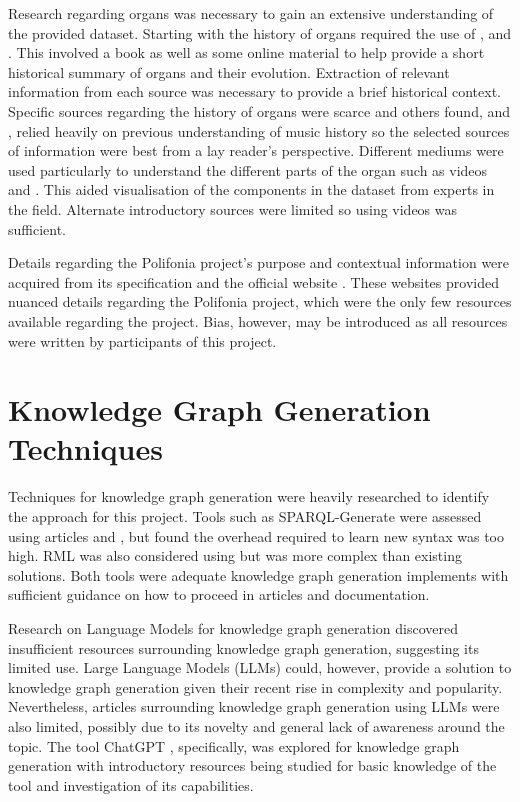 Research regarding organs was necessary to gain an extensive understanding of the provided dataset. Starting with the history of organs required the use of \cite{organhistory}, \cite{organhistory1} and \cite{organmedivalhistory}. This involved a book as well as some online material to help provide a short historical summary of organs and their evolution. Extraction of relevant information from each source was necessary to provide a brief historical context. Specific sources regarding the history of organs were scarce and others found, \cite{apel1948early} and \cite{ochse1988history}, relied heavily on previous understanding of music history so the selected sources of information were best from a lay reader's perspective. Different mediums were used particularly to understand the different parts of the organ such as videos \cite{organvideo} and \cite{organvideo1}. This aided visualisation of the components in the dataset from experts in the field. Alternate introductory sources were limited so using videos was sufficient. 

Details regarding the Polifonia project's purpose and contextual information were acquired from its specification \cite{polifoniaproject} and the official website \cite{polifonia}. These websites provided nuanced details regarding the Polifonia project, which were the only few resources available regarding the project. Bias, however, may be introduced as all resources were written by participants of this project. 

\section{Knowledge Graph Generation Techniques}
\hspace{0.5cm} Techniques for knowledge graph generation were heavily researched to identify the approach for this project. Tools such as SPARQL-Generate \cite{sparqlgenerate} were assessed using articles \cite{lefranccois2017flexible} and \cite{lefranccois2017sparql}, but found the overhead required to learn new syntax was too high. RML \cite{rml} was also considered using \cite{dimou2014rml} but was more complex than existing solutions. Both tools were adequate knowledge graph generation implements with sufficient guidance on how to proceed in articles and documentation. 

Research on Language Models for knowledge graph generation discovered insufficient resources surrounding knowledge graph generation, suggesting its limited use. Large Language Models (LLMs) \cite{rouse_2023} could, however, provide a solution to knowledge graph generation given their recent rise in complexity and popularity. Nevertheless, articles surrounding knowledge graph generation using LLMs were also limited, possibly due to its novelty and general lack of awareness around the topic. The tool ChatGPT \cite{chatgptwebsite}, specifically, was explored for knowledge graph generation with introductory resources \cite{chatgpt} being studied for basic knowledge of the tool and investigation of its capabilities. 

